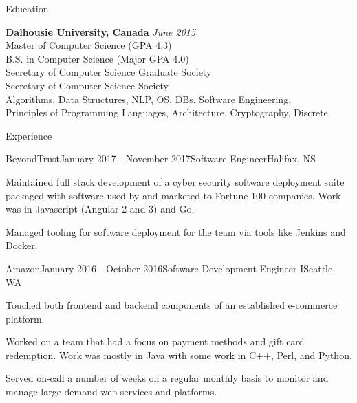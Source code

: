 \documentclass{resume} %
\begin{document}

\begin{rSection}{Education}

{\bf Dalhousie University, Canada} \hfill {\em June 2015} \\ 
Master of Computer Science (GPA 4.3) \\
B.S. in Computer Science (Major GPA 4.0) \smallskip \\
Secretary of Computer Science Graduate Society \\
Secretary of Computer Science Society \smallskip \\
Algorithms, Data Structures, NLP, OS, DBs, Software Engineering, \\
Principles of Programming Languages, Architecture, Cryptography, Discrete

\end{rSection}


\begin{rSection}{Experience}

\begin{rSubsection}{BeyondTrust}{January 2017 - November 2017}{Software Engineer}{Halifax, NS}
\item Maintained full stack development of a cyber security software deployment suite packaged with software used by and marketed to Fortune 100 companies. Work was in Javascript (Angular 2 and 3) and Go.
\item Managed tooling for software deployment for the team via tools like Jenkins and Docker.  
\end{rSubsection}


\begin{rSubsection}{Amazon}{January 2016 - October 2016}{Software Development Engineer I}{Seattle, WA}
\item Touched both frontend and backend components of an established e-commerce platform.
\item Worked on a team that had a focus on payment methods and gift card redemption. Work was mostly in Java with some work in C++, Perl, and Python.
\item Served on-call a number of weeks on a regular monthly basis to monitor and manage large demand web services and platforms.
\end{rSubsection}

\end{rSection}
\end{document}
